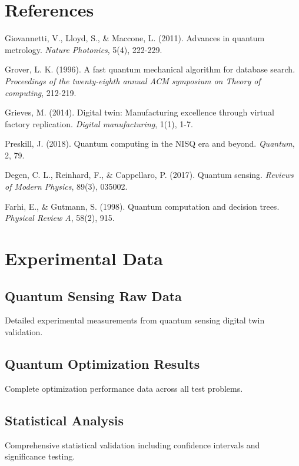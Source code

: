 \documentclass[12pt,a4paper]{report}
\begin{document}
\chapter*{References}

\begin{thebibliography}{99}

Giovannetti, V., Lloyd, S., \& Maccone, L. (2011). Advances in quantum metrology. \textit{Nature Photonics}, 5(4), 222-229.

Grover, L. K. (1996). A fast quantum mechanical algorithm for database search. \textit{Proceedings of the twenty-eighth annual ACM symposium on Theory of computing}, 212-219.

Grieves, M. (2014). Digital twin: Manufacturing excellence through virtual factory replication. \textit{Digital manufacturing}, 1(1), 1-7.

Preskill, J. (2018). Quantum computing in the NISQ era and beyond. \textit{Quantum}, 2, 79.

Degen, C. L., Reinhard, F., \& Cappellaro, P. (2017). Quantum sensing. \textit{Reviews of Modern Physics}, 89(3), 035002.

Farhi, E., \& Gutmann, S. (1998). Quantum computation and decision trees. \textit{Physical Review A}, 58(2), 915.

\end{thebibliography}

\appendix

\chapter{Experimental Data}

\section{Quantum Sensing Raw Data}

Detailed experimental measurements from quantum sensing digital twin validation.

\section{Quantum Optimization Results}

Complete optimization performance data across all test problems.

\section{Statistical Analysis}

Comprehensive statistical validation including confidence intervals and significance testing.


\end{document}
